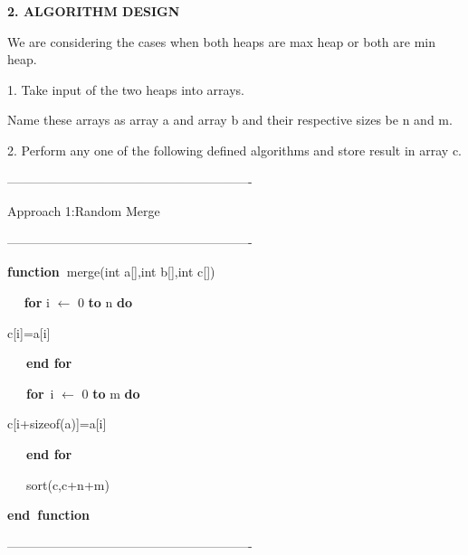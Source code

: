 \documentclass[12pt]{article}
\renewcommand{\_}{\kern-1.5pt\textunderscore\kern-1.5pt}
\begin{document}
\begin{multicols}{2}
\begin{enumerate}
\vspace{\baselineskip}
\begin{Center}
\textbf{2. ALGORITHM DESIGN}
\end{Center}\par

We are considering the cases when both heaps are max heap or both are min heap.\par

1. Take input of the two heaps into arrays.\par

Name these arrays as array a and array b and their respective sizes be n and m.\par

2. Perform any one of the following defined algorithms and store result in array c.\par


\vspace{\baselineskip}
----------------------------------------------------------\par

Approach 1:Random Merge\par

----------------------------------------------------------\par

\textbf{function\  }merge(int a[],int b[],int c[])\par

\ \  \textbf{ for } i $ \leftarrow $  0 \textbf{to} n \textbf{do}\par

\tab c[i]=a[i]\par

\ \ \  \textbf{end for}\par

\ \ \  \textbf{for}\  i $ \leftarrow $  0 \textbf{to} m \textbf{do}\par

\tab c[i+sizeof(a)]=a[i]\par

\ \ \  \textbf{end for}\par

\ \ \  sort(c,c+n+m) \par

\textbf{end\  function}\par

----------------------------------------------------------\par


\end{enumerate}
\end{multicols}
\end{document}
